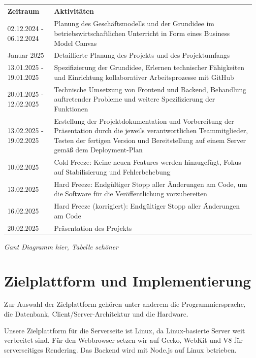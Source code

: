 \documentclass[a4paper,12pt]{article}
\begin{document}
\newpage
\begin{longtable}{|p{4cm}|p{11cm}|}
	\hline
	\textbf{Zeitraum} & \textbf{Aktivitäten} \\
	\hline
	02.12.2024 - 06.12.2024 & Planung des Geschäftsmodells und der Grundidee im betriebswirtschaftlichen Unterricht in Form eines Business Model Canvas \\
	\hline
	Januar 2025 & Detaillierte Planung des Projekts und des Projektumfangs \\
	\hline
	13.01.2025 - 19.01.2025 & Spezifizierung der Grundidee, Erlernen technischer Fähigkeiten und Einrichtung kollaborativer Arbeitsprozesse mit GitHub \\
	\hline
	20.01.2025 - 12.02.2025 & Technische Umsetzung von Frontend und Backend, Behandlung auftretender Probleme und weitere Spezifizierung der Funktionen \\
	\hline
	13.02.2025 - 19.02.2025 & Erstellung der Projektdokumentation und Vorbereitung der Präsentation durch die jeweils verantwortlichen Teammitglieder, Testen der fertigen Version und Bereitstellung auf einem Server gemäß dem Deployment-Plan \\
	\hline
	10.02.2025 & Cold Freeze: Keine neuen Features werden hinzugefügt, Fokus auf Stabilisierung und Fehlerbehebung \\
	\hline
	13.02.2025 & Hard Freeze: Endgültiger Stopp aller Änderungen am Code, um die Software für die Veröffentlichung vorzubereiten \\
	\hline
	16.02.2025 & Hard Freeze (korrigiert): Endgültiger Stopp aller Änderungen am Code \\
	\hline
	20.02.2025 & Präsentation des Projekts \\
	\hline
\end{longtable}

\textit{
Gant Diagramm hier, Tabelle schöner
}

\newpage \section{Zielplattform und Implementierung}
Zur Auswahl der Zielplattform gehören unter anderem die Programmiersprache, die Datenbank, Client/Server-Architektur und die Hardware.

Unsere Zielplattform für die Serverseite ist Linux, da Linux-basierte Server weit verbreitet sind. Für den Webbrowser setzen wir auf Gecko, WebKit und V8 für serverseitiges Rendering. Das Backend wird mit Node.js auf Linux betrieben.
\end{document}
